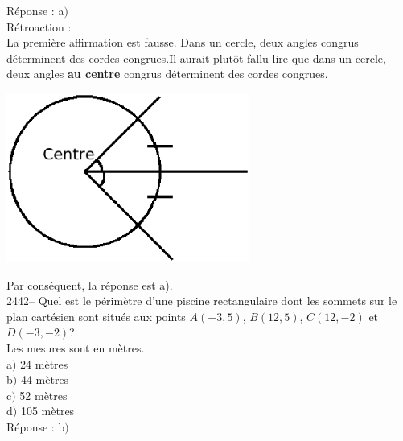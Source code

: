 \documentclass[letterpaper, 12pt]{article}
\begin{document}
R\'eponse : a$)$\\

R\'etroaction :\\
La premi\`ere affirmation est fausse. \og Dans un cercle, deux angles congrus d\'eterminent des cordes congrues.\fg Il aurait plut\^ot fallu lire que dans un cercle, deux angles \textbf{au centre} congrus d\'eterminent des cordes congrues.
\begin{center}
 \includegraphics[width=8cm,bb=0 552 493 842]{Q2441.eps}
\end{center}
Par cons\'equent, la r\'eponse est a).\\


2442-- Quel est le p\'erim\`etre d'une piscine rectangulaire dont les sommets sur le plan cart\'esien sont situ\'es aux points $A(-3, 5)$, $B(12, 5)$, $C(12, -2)$ et $D(-3, -2)$?\\
Les mesures sont en m\`etres.\\

a$)$ 24 m\`etres\\
b$)$ 44 m\`etres\\
c$)$ 52 m\`etres\\
d$)$ 105 m\`etres\\

R\'eponse : b$)$\\
\end{document}
